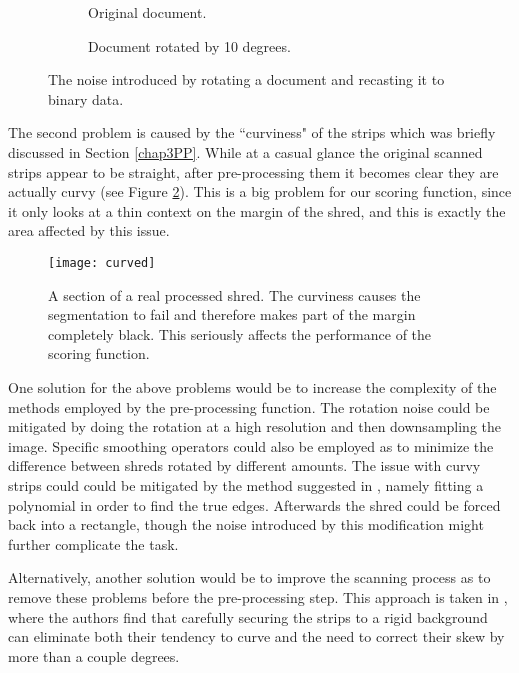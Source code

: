 \begin{figure}[h]
        \setlength{\fboxsep}{-0.1cm}
        \centering
                \begin{subfigure}[t]{0.47\textwidth}
                        \centering
                        \caption{Original document.}
                \end{subfigure}
                \begin{subfigure}[t]{0.47\textwidth}
                        \centering
                        \caption{Document rotated by 10 degrees.}
                \end{subfigure}
    \caption{The noise introduced by rotating a document and recasting it to binary data.}
    \label{fig:skewProb}
\end{figure}

The second problem is caused by the ``curviness" of the strips which was briefly discussed in Section \ref{chap3PP}. While at a casual glance the original scanned strips appear to be straight, after pre-processing them it becomes clear they are actually curvy (see Figure \ref{fig:curvy}). This is a big problem for our scoring function, since it only looks at a thin context on the margin of the shred, and this is exactly the area affected by this issue.

\begin{figure}[h]
    \vspace{1em}
    \centering
    \texttt{[image: curved]}
    \caption{A section of a real processed shred. The curviness causes the segmentation to fail and therefore makes part of the margin completely black. This seriously affects the performance of the scoring function.}
    \label{fig:curvy}
\end{figure}

One solution for the above problems would be to increase the complexity of the methods employed by the pre-processing function. The rotation noise could be mitigated by doing the rotation at a high resolution and then downsampling the image. Specific smoothing operators could also be employed as to minimize the difference between shreds rotated by different amounts. The issue with curvy strips could could be mitigated by the method suggested in \cite{P26}, namely fitting a polynomial in order to find the true edges. Afterwards the shred could be forced back into a rectangle, though the noise introduced by this modification might further complicate the task.

Alternatively, another solution would be to improve the scanning process as to remove these problems before the pre-processing step. This approach is taken in \cite{P51}, where the authors find that carefully securing the strips to a rigid background can eliminate both their tendency to curve and the need to correct their skew by more than a couple degrees.
